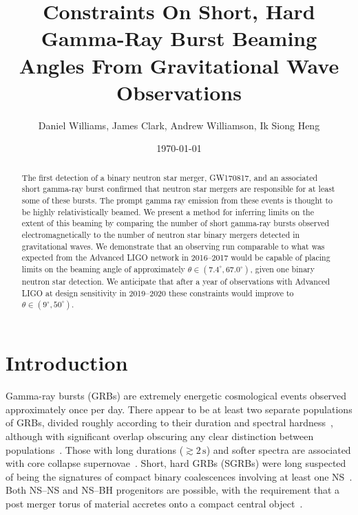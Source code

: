 \documentclass[twocolumn,nofootinbib]{revtex4-1}
\newcommand{\BNS}{\ac{NS}--\ac{NS}\xspace}
\newcommand{\NSBH}{\ac{NS}--\ac{BH}\xspace}
\begin{document}
\title{Constraints On Short, Hard Gamma-Ray Burst Beaming Angles From
Gravitational Wave Observations}
\author{Daniel Williams, James Clark, Andrew Williamson, Ik Siong Heng}
\date{\today}

\begin{abstract}
The first detection of a binary neutron star merger, GW170817, and an associated
short gamma-ray burst confirmed that neutron star mergers are responsible for at
least some of these bursts. The prompt gamma ray emission from these events is
thought to be highly relativistically beamed. We present a method for inferring
limits on the extent of this beaming by comparing the number of short gamma-ray
bursts observed electromagnetically to the number of neutron star binary mergers
detected in gravitational waves.
We demonstrate that an observing run comparable to what was expected
from the Advanced LIGO network in 2016--2017 would be capable
of placing limits on the beaming angle of approximately
$\theta \in (7.4^\circ,67.0^\circ)$, given one binary neutron star
detection.
We anticipate that after a year of observations with Advanced LIGO at design
sensitivity in 2019--2020 these constraints would improve to
$\theta \in (9^\circ,50^\circ)$. 
\end{abstract}

\maketitle

\section{Introduction}

Gamma-ray bursts (GRBs) are extremely energetic cosmological events
observed approximately once per day. There appear to be at least two separate
populations of \acp{GRB}, divided roughly according to their duration and
spectral hardness~\cite{Kouveliotou:1993yx}, although with significant overlap
obscuring any clear distinction between
populations~\cite{Zhang:2009uf,Bromberg:2012gp}.
Those with long durations ($\gtrsim 2\,\mathrm{s}$) and softer spectra are associated
with core collapse
supernovae~\cite{Galama:1998ea,MacFadyen:1998vz,Woosley:2006fn}. Short, hard
\acp{GRB} (SGRBs) were long suspected of being the signatures of
compact binary coalescences involving at least one
\ac{NS}~\cite{Blinnikov1984,Eichler:1989ve,Paczynski:1991aq,Narayan:1992iy,Lee:2007js}.
Both \BNS and \NSBH progenitors are possible, with the requirement that a post
merger torus of material accretes onto a compact central
object~\cite{Blandford:1977ds,Rosswog:2002rt,Giacomazzo:2012zt}.
\end{document}
